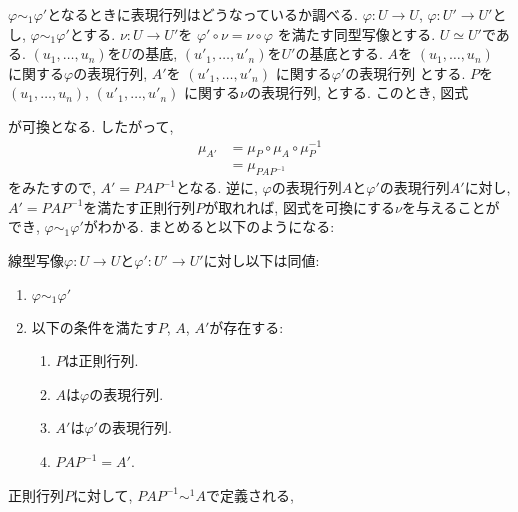 $\varphi\sim_1\varphi'$となるときに表現行列はどうなっているか調べる.
$\varphi\colon U\to U$,
$\varphi\colon U'\to U'$とし,
$\varphi\sim_1\varphi'$とする.
$\nu\colon U\to U'$を
$\varphi'\circ\nu=\nu\circ \varphi$
を満たす同型写像とする.
$U\simeq U'$である.
$(u_1,\ldots,u_n)$を$U$の基底,
$(u'_1,\ldots,u'_n)$を$U'$の基底とする.
$A$を
$(u_1,\ldots,u_n)$
に関する$\varphi$の表現行列,
$A'$を
$(u'_1,\ldots,u'_n)$
に関する$\varphi'$の表現行列
とする.
$P$を
$(u_1,\ldots,u_n)$,
$(u'_1,\ldots,u'_n)$
に関する$\nu$の表現行列,
とする.
このとき, 図式
\begin{center}
\end{center}
が可換となる.
したがって,
\begin{align*}
  \mu_{A'}&=\mu_{P}\circ \mu_A \circ \mu_{P}^{-1}\\
  &=\mu_{PAP^{-1}}
\end{align*}
をみたすので, $A'=PAP^{-1}$となる.
逆に, $\varphi$の表現行列$A$と$\varphi'$の表現行列$A'$に対し,
$A'=PAP^{-1}$を満たす正則行列$P$が取れれば,
図式を可換にする$\nu$を与えることができ,
$\varphi\sim_1 \varphi'$がわかる.
まとめると以下のようになる:
\begin{prop}
  線型写像$\varphi\colon U\to U$と$\varphi'\colon U'\to U'$に対し以下は同値:
  \begin{enumerate}
  \item $\varphi\sim_1\varphi'$
  \item 以下の条件を満たす$P$, $A$, $A'$が存在する:
    \begin{enumerate}
    \item $P$は正則行列.
    \item $A$は$\varphi$の表現行列.
    \item $A'$は$\varphi'$の表現行列.
    \item $PAP^{-1}=A'$.
    \end{enumerate}
  \end{enumerate}
\end{prop}
正則行列$P$に対して, $PAP^{-1}\sim^{1} A$で定義される,
